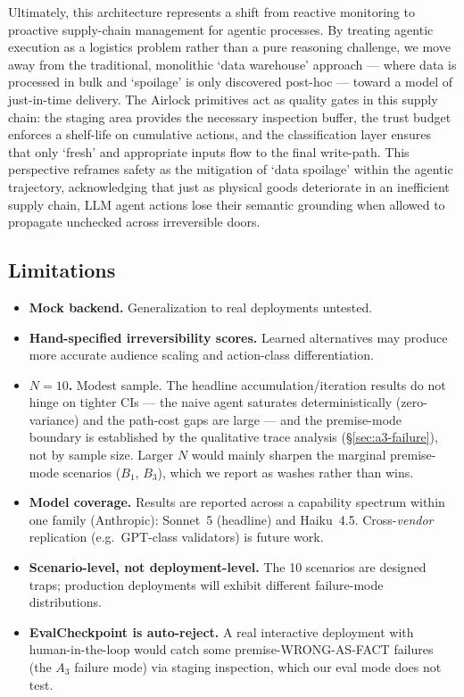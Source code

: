 \documentclass[11pt]{article}
\begin{document}
Ultimately, this architecture represents a shift from reactive monitoring to proactive supply-chain management for agentic processes. By treating agentic execution as a logistics problem rather than a pure reasoning challenge, we move away from the traditional, monolithic `data warehouse' approach --- where data is processed in bulk and `spoilage' is only discovered post-hoc --- toward a model of just-in-time delivery. The Airlock primitives act as quality gates in this supply chain: the staging area provides the necessary inspection buffer, the trust budget enforces a shelf-life on cumulative actions, and the classification layer ensures that only `fresh' and appropriate inputs flow to the final write-path. This perspective reframes safety as the mitigation of `data spoilage' within the agentic trajectory, acknowledging that just as physical goods deteriorate in an inefficient supply chain, LLM agent actions lose their semantic grounding when allowed to propagate unchecked across irreversible doors.

\subsection{Limitations}

\begin{itemize}[leftmargin=*]
\item \textbf{Mock backend.} Generalization to real deployments untested.
\item \textbf{Hand-specified irreversibility scores.} Learned alternatives may produce more accurate audience scaling and action-class differentiation.
\item \textbf{$N = 10$.} Modest sample. The headline accumulation/iteration results do not hinge on tighter CIs --- the naive agent saturates deterministically (zero-variance) and the path-cost gaps are large --- and the premise-mode boundary is established by the qualitative trace analysis (§\ref{sec:a3-failure}), not by sample size. Larger $N$ would mainly sharpen the marginal premise-mode scenarios ($B_1$, $B_3$), which we report as washes rather than wins.
\item \textbf{Model coverage.} Results are reported across a capability spectrum within one family (Anthropic): Sonnet~5 (headline) and Haiku~4.5. Cross-\emph{vendor} replication (e.g.\ GPT-class validators) is future work.
\item \textbf{Scenario-level, not deployment-level.} The 10 scenarios are designed traps; production deployments will exhibit different failure-mode distributions.
\item \textbf{EvalCheckpoint is auto-reject.} A real interactive deployment with human-in-the-loop would catch some premise-WRONG-AS-FACT failures (the $A_3$ failure mode) via staging inspection, which our eval mode does not test.
\end{itemize}
\end{document}
